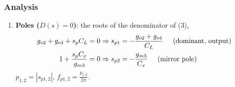\subsubsection{Analysis}
\begin{enumerate}
  \item \textbf{Poles (\(D(s) = 0\))}: the roots of the denominator of (3),
    \begin{align*}
      g_{o2} + g_{o4} + s_p C_L = 0 &\Rightarrow s_{p1} = -\frac{g_{o2} + g_{o4}}{C_L} \hspace{0.5cm} \text{(dominant, output)} \\
      1 + \frac{s_p C_x}{g_{m3}} = 0 &\Rightarrow s_{p2} = -\frac{g_{m3}}{C_x} \hspace{0.5cm} \text{(mirror pole)}
    \end{align*}
    \(p_{1,2} = |s_{p1,2}|\), \(f_{p1,2} = \frac{p_{1,2}}{2\pi}\).


\end{enumerate}
